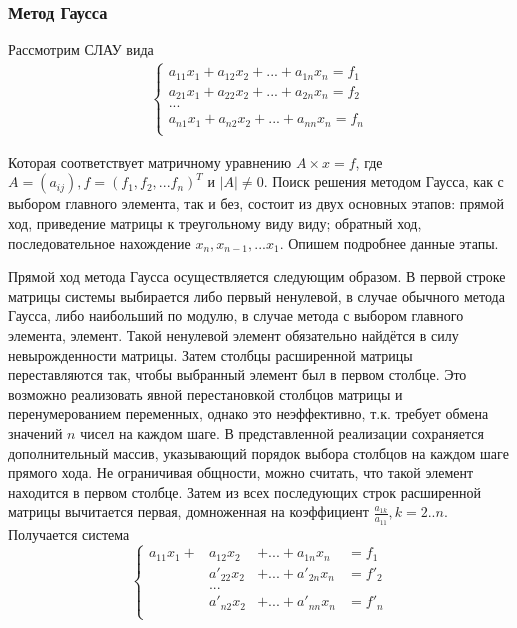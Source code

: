 \documentclass[a4paper,12pt,titlepage,finall]{article}
\begin{document}
\subsubsection{Метод Гаусса}
Рассмотрим СЛАУ вида
\begin{align*}
\begin{cases}
a_{11} x_1 + a_{12} x_2 + ... + a_{1n} x_n = f_1\\
a_{21} x_1 + a_{22} x_2 + ... + a_{2n} x_n = f_2\\
...\\
a_{n1} x_1 + a_{n2} x_2 + ... + a_{nn} x_n = f_n\\
\end{cases}
\end{align*}
\par
Которая соответствует матричному уравнению $A \times x = f$, где $A = (a_{ij}), f = (f_1, f_2, ... f_n)^T$ и $|A| \neq 0$. Поиск решения методом Гаусса, как с выбором главного элемента, так и без, состоит из двух основных этапов: прямой ход, приведение матрицы к треугольному виду виду; обратный ход, последовательное нахождение $x_n, x_{n - 1}, ... x_1$. Опишем подробнее данные этапы.
\par
Прямой ход метода Гаусса осуществляется следующим образом. В первой строке матрицы системы выбирается либо первый ненулевой, в случае обычного метода Гаусса, либо наибольший по модулю, в случае метода с выбором главного элемента, элемент. Такой ненулевой элемент обязательно найдётся в силу невырожденности матрицы. Затем столбцы расширенной матрицы переставляются так, чтобы выбранный элемент был в первом столбце. Это возможно реализовать явной перестановкой столбцов матрицы и перенумерованием переменных, однако это неэффективно, т.к. требует обмена значений $n$ чисел на каждом шаге. В представленной реализации сохраняется дополнительный массив, указывающий порядок выбора столбцов на каждом шаге прямого хода. Не ограничивая общности, можно считать, что такой элемент находится в первом столбце. Затем из всех последующих строк расширенной матрицы вычитается первая, домноженная на коэффициент $\frac{a_{1k}}{a_{11}}, k = 2 .. n$. Получается система
\begin{equation*}
\left\{
\begin{alignedat}{3}
a_{11} x_1 + &a_{12} x_2 &+ ... + a_{1n} x_n & = f_1\\
           &a'_{22} x_2 &+ ... + a'_{2n} x_n & = f'_2\\
&...&&\\
           &a'_{n2} x_2 &+ ... + a'_{nn} x_n & = f'_n\\
\end{alignedat}
\right.
\end{equation*}
\end{document}
